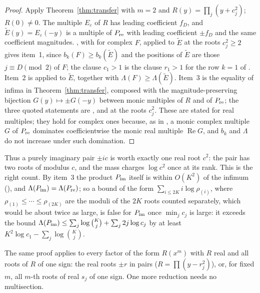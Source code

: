 \documentclass[11pt]{article}
\begin{document}
\begin{proof}
Apply Theorem~\ref{thm:transfer} with $m=2$ and $R(y)=\prod_j(y+c_j^2)$;
$R(0)\ne0$.  The multiple $E_\varepsilon$ of $R$ has leading coefficient
$f_D$, and $\tilde E(y)=E_\varepsilon(-y)$ is a multiple of $P_{\rm re}$
with leading coefficient $\pm f_D$ and the same coefficient magnitudes.  \cite[Theorem~3.2]{coefficient-mass}, with \cite[Corollary~3.3]{coefficient-mass} for complex $F$, applied to
$\tilde E$ at the roots $c_j^2\ge2$ gives item~1, since
$b_k(F)\ge b_k(\tilde E)$ and the positions of $\tilde E$ are those
$j\equiv D\pmod 2$ of $F$; the clause $c_1>1$ is the clause $r_1>1$ for the row $k=1$ of
\cite[Theorem~3.2]{coefficient-mass}.  Item~2 is \cite[Corollary~3.4]{coefficient-mass} applied to $\tilde E$, together with
$\Lambda(F)\ge\Lambda(\tilde E)$.  Item~3 is the equality of infima in
Theorem~\ref{thm:transfer}, composed with the magnitude-preserving
bijection $G(y)\mapsto\pm G(-y)$ between monic multiples of $R$ and of
$P_{\rm re}$; the three quoted statements are \cite[Corollary~4.3]{coefficient-mass},
\cite[Proposition~4.2]{coefficient-mass} and \cite[Proposition~4.4]{coefficient-mass} at
the roots $c_j^2$.  These are stated for real multiples; they hold for complex
ones because, as in \cite[Corollary~3.3]{coefficient-mass}, a monic complex
multiple $G$ of $P_{\rm re}$ dominates coefficientwise the monic real multiple
$\operatorname{Re}G$, and $b_k$ and $\Lambda$ do not increase under such
domination.
\end{proof}

Thus a purely imaginary pair $\pm ic$ is worth exactly one real root $c^2$:
the pair has two roots of modulus $c$, and the mass charges $\log c^2$ once
at its rank.  This is the right count.  By item~3 the product
$P_{\rm im}$ itself is within $O(K^2)$ of the infimum
(\cite[Corollary~3.7]{coefficient-mass}), and $\Lambda(P_{\rm im})=\Lambda(P_{\rm re})$; so a
bound of the form $\sum_{i\le2K}i\log\rho_{(i)}$, where
$\rho_{(1)}\le\cdots\le\rho_{(2K)}$ are the moduli of the $2K$ roots
counted separately, which would be about twice as large, is false for
$P_{\rm im}$ once $\min_jc_j$ is large: it exceeds the bound
$\Lambda(P_{\rm im})\le\sum_j\log\binom Kj+\sum_j2j\log c_j$ by at least
$K^2\log c_1-\sum_j\log\binom Kj$.

The same proof applies to every factor of the form $R(x^m)$ with $R$ real
and all roots of $R$ of one sign: the real roots $\pm r$ in pairs
($R=\prod(y-r_j^2)$), or, for fixed $m$, all $m$-th roots of real $s_j$ of
one sign.  One
more reduction needs no multisection.
\end{document}
